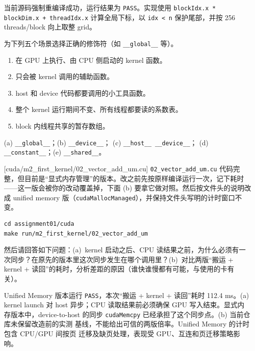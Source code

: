 \documentclass[11pt,a4paper,fontset=fandol]{ctexart}
\begin{document}
\begin{answer}
当前源码强制重编译成功，运行结果为 \texttt{PASS}。实现使用
\texttt{blockIdx.x * blockDim.x + threadIdx.x} 计算全局下标，以
\texttt{idx < n} 保护尾部，并按 256 threads/block 向上取整 grid。
\end{answer}

为下列五个场景选择正确的修饰符（如 \texttt{\_\_global\_\_} 等）。
\begin{enumerate}[label=(\alph*)]
  \item 在 GPU 上执行、由 CPU 侧启动的 kernel 函数。
  \item 只会被 kernel 调用的辅助函数。
  \item host 和 device 代码都要调用的小工具函数。
  \item 整个 kernel 运行期间不变、所有线程都要读的系数表。
  \item block 内线程共享的暂存数组。
\end{enumerate}

\begin{answer}
(a) \texttt{\_\_global\_\_}；(b) \texttt{\_\_device\_\_}；
(c) \texttt{\_\_host\_\_ \_\_device\_\_}；
(d) \texttt{\_\_constant\_\_}；(e) \texttt{\_\_shared\_\_}。
\end{answer}

[cuda/m2\_first\_kernel/02\_vector\_add\_um.cu]
\texttt{02\_vector\_add\_um.cu} 代码完整，但目前是“显式内存管理”的版本。改之前先按原样编译运行一次，记下耗时——这一版会被你的改动覆盖掉，下面 (b) 要拿它做对照。然后按文件头的说明改成 unified memory 版（\texttt{cudaMallocManaged}），并保持文件头写明的计时窗口不变。

\begin{lstlisting}
cd assignment01/cuda
make run/m2_first_kernel/02_vector_add_um
\end{lstlisting}

然后请回答如下问题：(a)~kernel 启动之后、CPU 读结果之前，为什么必须有一次同步？在原先的版本里这次同步发生在哪个调用里？(b)~对比两版“搬运 + kernel + 读回”的耗时，分析差距的原因（谁快谁慢都有可能，与使用的卡有关）。

\begin{answer}
Unified Memory 版本运行 \texttt{PASS}，本次“搬运 + kernel + 读回”耗时
112.4 ms。(a) kernel launch 对 host 异步；CPU 读取结果前必须确保 GPU
写入结束。显式内存版本中，device-to-host 的同步
\texttt{cudaMemcpy} 已经承担了这个同步点。(b) 当前仓库未保留改造前的实测
基线，不能给出可信的两版倍率。Unified Memory 的计时包含 CPU/GPU 间按页
迁移及缺页处理，表现受 GPU、互连和页迁移策略影响。
\end{answer}
\end{document}
